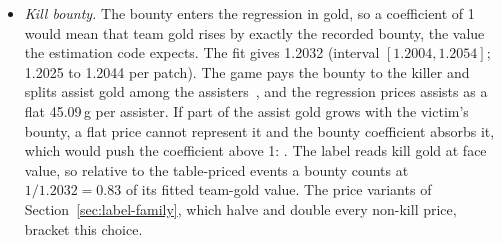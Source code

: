 \begin{itemize}
  upgrade, and patch 26.1 restored it~\cite{riot2025patch25s11,riot2026patch261,lolwiki2026turret}. The
  coefficient is $-53.44$\,g (interval $[-55.45, -50.83]$\,g). The first turret to fall is an outer
  turret in all 294 of 300 sampled matches in which a turret fell, so the indicator only contrasts the
  minute of the first outer turret with that of an average outer turret, and we do not interpret it.
  The table omits the term, so the label pays no first-turret bonus, which matches the rule in force.
\item \emph{Kill bounty.} The bounty enters the regression in gold, so a coefficient of 1 would mean
  that team gold rises by exactly the recorded bounty, the value the estimation code expects. The fit
  gives 1.2032 (interval $[1.2004, 1.2054]$; 1.2025 to 1.2044 per patch). The game pays the bounty to
  the killer and splits assist gold among the assisters~\cite{lolwiki2026kill}, and the regression
  prices assists as a flat 45.09\,g per assister. If part of the assist gold grows with the victim's
  bounty, a flat price cannot represent it and the bounty coefficient absorbs it, which would push the
  coefficient above 1: .
  The label reads kill gold at face value, so relative to the table-priced events a bounty counts at
  $1/1.2032 = 0.83$ of its fitted team-gold value. The price variants of
  Section~\ref{sec:label-family}, which halve and double every non-kill price, bracket this choice.

\end{itemize}
